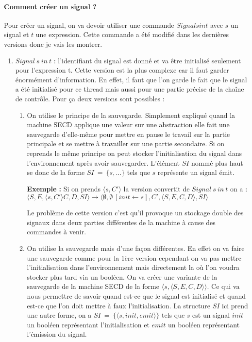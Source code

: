 \documentclass[10pt,a4paper]{article}
\begin{document}
					\paragraph{Comment créer un signal ?}
					Pour créer un signal, on va devoir utiliser une commande $Signal s in t$ avec $s$ un signal et $t$ une expression. Cette commande a été modifié dans les dernières versions donc je vais les montrer.
					\smallbreak
					\begin{enumerate}
						\item $Signal~s~in~t$ : l'identifiant du signal est donné et va être initialisé seulement pour l'expression t. Cette version est la plus complexe car il faut garder énormément d'information. En effet, il faut que l'on garde le fait que le signal a été initialisé pour ce thread mais aussi pour une partie précise de la chaîne de contrôle. Pour ça deux versions sont possibles :
						\begin{enumerate}
							\item On utilise le principe de la sauvegarde. Simplement expliqué quand la machine SECD applique une valeur sur une abstraction elle fait une sauvegarde d'elle-même pour mettre en pause le travail sur la partie principale et se mettre à travailler sur une partie secondaire. Si on reprends le même principe on peut stocker l'initialisation du signal dans l'environnement après avoir sauvegarder. L'élément $SI$ nommé plus haut se donc de la forme $SI~=~\{s,...\}$ tels que $s$ représente un signal émit.
							\medbreak
							
							\textbf{Exemple :} Si on prends $\langle s,C'\rangle$ la version convertit de $Signal~s~in~t$ on a : 
							\\$\langle S,E,\langle s,C'\rangle C,D,SI\rangle \longrightarrow \langle \emptyset,\emptyset~[init \leftarrow s],C',\langle S,E,C,D\rangle,SI\rangle$  
							\medbreak
							
							Le problème de cette version c'est qu'il provoque un stockage double des signaux dans deux parties différentes de la machine à cause des commandes à venir.
							
							\item On utilise la sauvegarde mais d'une façon différentes. En effet on va faire une sauvegarde comme pour la 1ère version cependant on va pas mettre l'initialisation dans l'environnement mais directement la où l'on voudra stocker plus tard via un booléen. On va créer une variante de la sauvegarde de la machine SECD de la forme $\langle s,\langle S,E,C,D\rangle\rangle$. Ce qui va nous permettre de savoir quand est-ce que le signal est initialisé et quand est-ce que l'on doit mettre à faux l'initialisation. La structure $SI$ ici prend une autre forme, on a $SI~=~\{\langle s,init,emit\rangle\}$ tels que $s$ est un signal $init$ un booléen représentant l'initialisation et $emit$ un booléen représentant l'émission du signal.
							\medbreak
							

\end{enumerate}
\end{enumerate}
\end{document}
